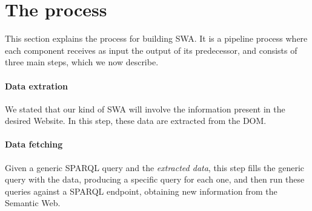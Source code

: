 \documentclass[runningheads]{llncs}
\begin{document}


\section{The process}
\label{sec-process}

This section explains the process for building SWA. It is a pipeline process where each component receives as input the output of its predecessor, and consists of three main steps, which we now describe.

\paragraph{Data extration} We stated that our kind of SWA will involve the information present in the desired Website. In this step, these data are extracted from the DOM.

\paragraph{Data fetching} Given a generic SPARQL query and the \textit{extracted data}, this step fills the generic query with the data, producing a specific query for each one, and then run these queries against a SPARQL endpoint, obtaining new information from the Semantic Web.
\end{document}
